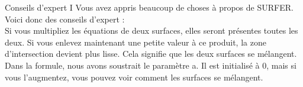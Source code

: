 \begin{surferPage}{Conseils d'expert I}
Vous avez appris beaucoup de choses à propos de SURFER. Voici donc des conseils d'expert :\\
\vspace{0.3cm}
Si vous multipliez les équations de deux surfaces, elles seront présentes toutes les deux. Si vous enlevez maintenant une petite valeur à ce produit, la zone d'intersection devient plus lisse. Cela signifie que les deux surfaces se mélangent.\\
\vspace{0.3cm}
Dans la formule, nous avons soustrait le paramètre a. Il est initialisé à 0, mais si vous l'augmentez, vous pouvez voir comment les surfaces se mélangent. 
\end{surferPage}
